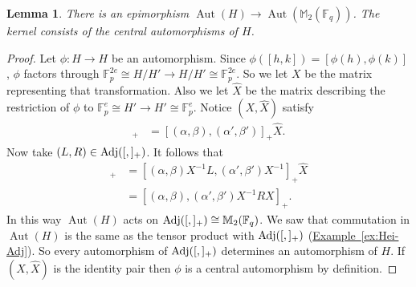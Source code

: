 \documentclass[11pt]{article}
\numberwithin{equation}{section}
\theoremstyle{definition}
\theoremstyle{plain}
\newcommand{\expref}[2]{\hyperref[#2]{#1~\ref{#2}}}
\numberwithin{equation}{section}
\theoremstyle{plain}       %
\newtheorem{lem}[equation]{Lemma}
\theoremstyle{remark}
\theoremstyle{definition}
\numberwithin{figure}{section}
\numberwithin{table}{section}
\newcommand{\bbF}{\mathbb{F}}  %
\DeclareMathOperator{\Aut}{Aut}  %
\begin{document}
\begin{lem}\label{lem:aut-H}
There is an epimorphism $\Aut(H)\to \Aut(\mathbb{M}_2(\bbF_q))$.  The kernel
consists of the central automorphisms of $H$.
\end{lem}
\begin{proof}
Let $\phi:H\to H$ be an automorphism.  Since $\phi([h,k])=[\phi(h),\phi(k)]$,
$\phi$ factors through $\bbF_p^{2e}\cong H/H'\to H/H'\cong\bbF_p^{2e}$. So we
let $X$ be the matrix representing that transformation.  Also we let $\hat{X}$
be the matrix describing the restriction of $\phi$ to $\bbF_p^e\cong H'\to
H'\cong\bbF_p^e$.  Notice $(X,\hat{X})$ satisfy
\begin{align*}
	[(\alpha,\beta)X,(\alpha',\beta')X]_+ 
		& = [(\alpha,\beta),(\alpha',\beta')]_+\hat{X}.
\end{align*}
Now take $(L,R)\in {\rm Adj}([,]_+)$.  It follows that
\begin{align*}
	[(\alpha,\beta)X^{-1}LX,(\alpha',\beta')]_+
		&= [(\alpha,\beta)X^{-1}L,(\alpha',\beta')X^{-1}]_+\hat{X}\\
%
		& =[(\alpha,\beta),(\alpha',\beta')X^{-1}RX]_+.
\end{align*}
In this way $\Aut(H)$ acts on ${\rm Adj}([,]_+)\cong \mathbb{M}_{2}(\bbF_q)$.
We saw that commutation in $\Aut(H)$ is the same as the tensor product with
${\rm Adj}([,]_+)$ (\expref{Example}{ex:Hei-Adj}).  So every automorphism of ${\rm
Adj}([,]_+)$ determines an automorphism of $H$.  If $(X,\hat{X})$ is the
identity pair then $\phi$ is a central automorphism by definition.
\end{proof}
\end{document}
